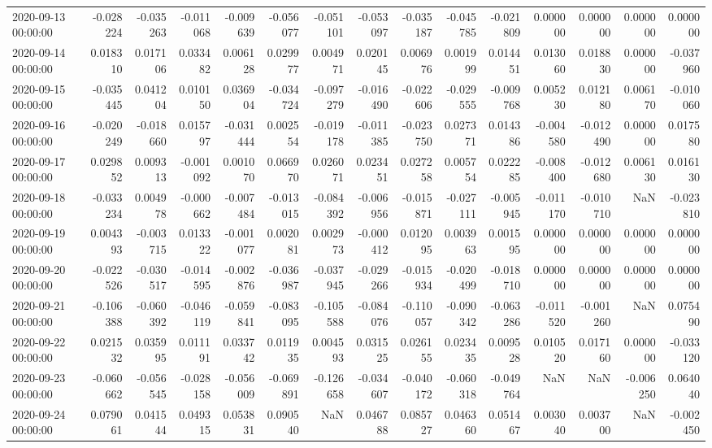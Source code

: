 \begin{tabular}{lrrrrrrrrrrrrrr}
2020-09-13 00:00:00 & -0.028224 & -0.035263 & -0.011068 & -0.009639 & -0.056077 & -0.051101 & -0.053097 & -0.035187 & -0.045785 & -0.021809 & 0.000000 & 0.000000 & 0.000000 & 0.000000 \\
2020-09-14 00:00:00 & 0.018310 & 0.017106 & 0.033482 & 0.006128 & 0.029977 & 0.004971 & 0.020145 & 0.006976 & 0.001999 & 0.014451 & 0.013060 & 0.018830 & 0.000000 & -0.037960 \\
2020-09-15 00:00:00 & -0.035445 & 0.041204 & 0.010150 & 0.036904 & -0.034724 & -0.097279 & -0.016490 & -0.022606 & -0.029555 & -0.009768 & 0.005230 & 0.012180 & 0.006170 & -0.010060 \\
2020-09-16 00:00:00 & -0.020249 & -0.018660 & 0.015797 & -0.031444 & 0.002554 & -0.019178 & -0.011385 & -0.023750 & 0.027371 & 0.014386 & -0.004580 & -0.012490 & 0.000000 & 0.017580 \\
2020-09-17 00:00:00 & 0.029852 & 0.009313 & -0.001092 & 0.001070 & 0.066970 & 0.026071 & 0.023451 & 0.027258 & 0.005754 & 0.022285 & -0.008400 & -0.012680 & 0.006130 & 0.016130 \\
2020-09-18 00:00:00 & -0.033234 & 0.004978 & -0.000662 & -0.007484 & -0.013015 & -0.084392 & -0.006956 & -0.015871 & -0.027111 & -0.005945 & -0.011170 & -0.010710 & NaN & -0.023810 \\
2020-09-19 00:00:00 & 0.004393 & -0.003715 & 0.013322 & -0.001077 & 0.002081 & 0.002973 & -0.000412 & 0.012095 & 0.003963 & 0.001595 & 0.000000 & 0.000000 & 0.000000 & 0.000000 \\
2020-09-20 00:00:00 & -0.022526 & -0.030517 & -0.014595 & -0.002876 & -0.036987 & -0.037945 & -0.029266 & -0.015934 & -0.020499 & -0.018710 & 0.000000 & 0.000000 & 0.000000 & 0.000000 \\
2020-09-21 00:00:00 & -0.106388 & -0.060392 & -0.046119 & -0.059841 & -0.083095 & -0.105588 & -0.084076 & -0.110057 & -0.090342 & -0.063286 & -0.011520 & -0.001260 & NaN & 0.075490 \\
2020-09-22 00:00:00 & 0.021532 & 0.035995 & 0.011191 & 0.033742 & 0.011935 & 0.004593 & 0.031525 & 0.026155 & 0.023435 & 0.009528 & 0.010520 & 0.017160 & 0.000000 & -0.033120 \\
2020-09-23 00:00:00 & -0.060662 & -0.056545 & -0.028158 & -0.056009 & -0.069891 & -0.126658 & -0.034607 & -0.040172 & -0.060318 & -0.049764 & NaN & NaN & -0.006250 & 0.064040 \\
2020-09-24 00:00:00 & 0.079061 & 0.041544 & 0.049315 & 0.053831 & 0.090540 & NaN & 0.046788 & 0.085727 & 0.046360 & 0.051467 & 0.003040 & 0.003700 & NaN & -0.002450 \\

\end{tabular}

